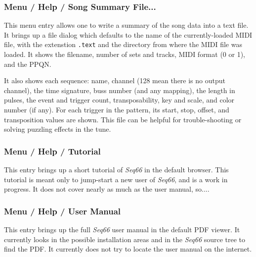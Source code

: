 \subsubsection{Menu / Help / Song Summary File...}
\label{subsubsec:menu_help_song_summary_file}

   This menu entry allows one to write a summary of the song data into a text
   file. It brings up a file dialog which defaults to the name of the
   currently-loaded MIDI file, with the extenstion \texttt{.text} and
   the directory from where the MIDI file was loaded.
   It shows the filename, number of sets and tracks, MIDI format (0 or 1),
   and the PPQN.

   It also shows each sequence: name, channel (128 mean there is no output
   channel), the time signature, buss number (and any mapping), the length in
   pulses, the event and trigger count, transposability, key and scale, and
   color number (if any).
   For each trigger in the pattern, its start, stop, offset, and transposition
   values are shown.
   This file can be helpful for trouble-shooting or solving puzzling effects in
   the tune.

\subsubsection{Menu / Help / Tutorial}
\label{subsubsec:menu_help_tutorial}

   This entry brings up a short tutorial of \textsl{Seq66} in the default
   browser. This tutorial is meant only to jump-start a new user of
   \textsl{Seq66}, and is a work in progress.
   It does not cover nearly as much as the user manual, so....

\subsubsection{Menu / Help / User Manual}
\label{subsubsec:menu_help_user_manual}

   This entry brings up the full \textsl{Seq66} user manual in the default
   PDF viewer.  It currently looks in the possible installation areas and in
   the \textsl{Seq66} source tree to find the PDF.
   It currently does not try to locate the user manual on the internet.

